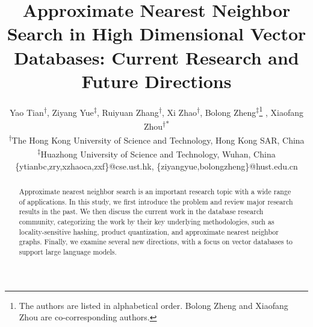 \documentclass[11pt]{article}
\begin{document}
\title{Approximate Nearest Neighbor Search in High Dimensional Vector Databases: Current Research and Future Directions}

\author{Yao Tian\textsuperscript{$\dagger$}, Ziyang Yue\textsuperscript{$\ddagger$}, Ruiyuan Zhang\textsuperscript{$\dagger$},  Xi Zhao\textsuperscript{$\dagger$}, Bolong Zheng\textsuperscript{$\ddagger$}\thanks{The authors are listed in alphabetical order. Bolong Zheng and Xiaofang Zhou are co-corresponding authors.} , Xiaofang Zhou\textsuperscript{$\dagger$}\textsuperscript{*}
\\
\textsuperscript{$\dagger$}The Hong Kong University of Science and Technology, Hong Kong SAR, China
\\
\textsuperscript{$\ddagger$}Huazhong University of Science and Technology, Wuhan, China\\ 
{\{ytianbc,zry,xzhaoca,zxf\}@cse.ust.hk, \{ziyangyue,bolongzheng\}@hust.edu.cn
}\\
}

\maketitle
\renewcommand\thesection{\arabic{section}}
\setcounter{section}{0}
\setcounter{figure}{0}
\setcounter{table}{0}
\begin{abstract}
Approximate nearest neighbor search is an important research topic with a wide range of applications. In this study, we first introduce the problem and review major research results in the past. We then discuss the current work in the database research community, categorizing the work by their key underlying methodologies, such as locality-sensitive hashing, product quantization, and approximate nearest neighbor graphs. Finally, we examine several new directions, with a focus on vector databases to support large language models. 
\end{abstract}


\end{document}
